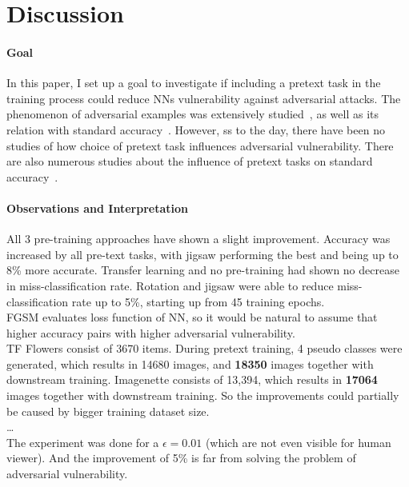 \section{Discussion}

\paragraph{Goal}In this paper, I set up a goal to investigate if including a pretext task in the training process could reduce NNs
vulnerability against adversarial attacks.
The phenomenon of adversarial examples was extensively studied~\cite{ilyas2019adversarial, DBLP:journals/corr/abs-1802-08195, goodfellow2015explaining},
as well as its relation with standard accuracy~\cite{https://doi.org/10.48550/arxiv.1805.12152}.
However, ss to the day, there have been no studies of how choice of pretext task influences adversarial vulnerability.
There are also numerous studies about the influence of pretext tasks on standard
accuracy~\cite{DBLP:journals/corr/abs-1912-01991, DBLP:journals/corr/NorooziF16, kolesnikov2019revisiting}.


\paragraph{Observations and Interpretation}
All 3 pre-training approaches have shown a slight improvement.
Accuracy was increased by all pre-text tasks, with jigsaw performing the best and being up to 8\% more accurate.
Transfer learning and no pre-training had shown no decrease in miss-classification rate.
Rotation and jigsaw were able to reduce miss-classification rate up to 5\%, starting up from 45 training epochs.
\\
FGSM evaluates loss function of NN,
so it would be natural to assume that higher accuracy pairs with higher adversarial vulnerability.
\\
TF Flowers consist of 3670 items.
During pretext training, 4 pseudo classes were generated,
which results in 14680 images, and \textbf{18350} images together with downstream training.
Imagenette consists of 13,394, which results in \textbf{17064} images together with downstream training.
So the improvements could partially be caused by bigger training dataset size.
\\
\ldots
\\
The experiment was done for a $\epsilon = 0.01$ (which are not even visible for human viewer).
And the improvement of 5\% is far from solving the problem of adversarial vulnerability.

